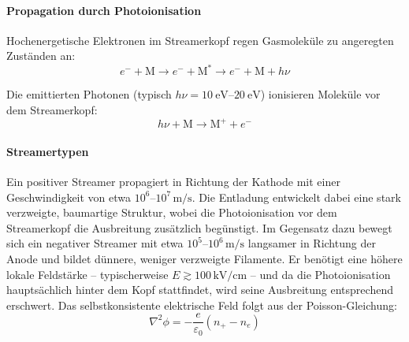 \paragraph{Propagation durch Photoionisation}
Hochenergetische Elektronen im Streamerkopf regen Gasmoleküle zu angeregten Zuständen an:
\begin{equation}
    e^- + \text{M} \rightarrow e^- + \text{M}^* \rightarrow e^- + \text{M} + h\nu
\end{equation}

Die emittierten Photonen (typisch $h\nu = \SIrange{10}{20}{\electronvolt}$) ionisieren Moleküle vor dem Streamerkopf:
\begin{equation}
    h\nu + \text{M} \rightarrow \text{M}^+ + e^-
\end{equation}


\paragraph{Streamertypen}
Ein positiver Streamer propagiert in Richtung der Kathode mit einer Geschwindigkeit von etwa $10^{6}\text{–}10^{7}\,\mathrm{m/s}$. Die Entladung entwickelt dabei eine stark verzweigte, baumartige Struktur, wobei die Photoionisation vor dem Streamerkopf die Ausbreitung zusätzlich begünstigt. Im Gegensatz dazu bewegt sich ein negativer Streamer mit etwa $10^{5}\text{–}10^{6}\,\mathrm{m/s}$ langsamer in Richtung der Anode und bildet dünnere, weniger verzweigte Filamente. Er benötigt eine höhere lokale Feldstärke – typischerweise $E \gtrsim 100\,\mathrm{kV/cm}$ – und da die Photoionisation hauptsächlich hinter dem Kopf stattfindet, wird seine Ausbreitung entsprechend erschwert.
Das selbstkonsistente elektrische Feld folgt aus der Poisson-Gleichung:
\begin{equation}
    \nabla^2 \phi = -\frac{e}{\varepsilon_0}(n_+ - n_e)
\end{equation}
